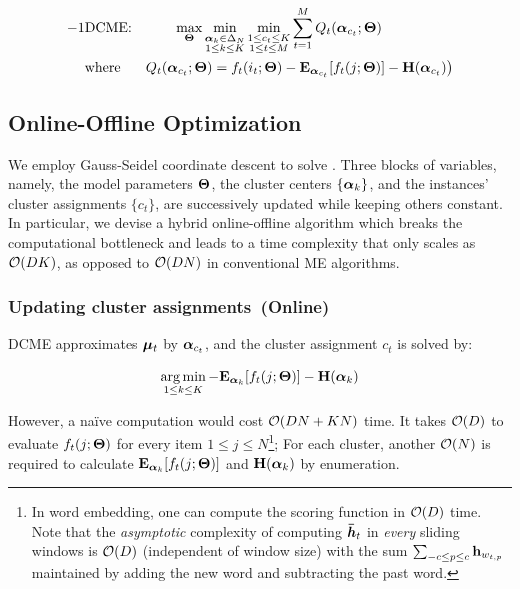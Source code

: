\begin{alignat}{-1}
  &\textrm{DCME:} && \qquad
\max\limits_\THETA
\min\limits_{\substack{\valpha_k \in \Delta_N \\ 1 \le k \le K}}
\min\limits_{\substack{1 \le c_t \le K \\ 1 \le t \le M}}
\sum\limits_{t=1}^M Q_t(\valpha_{c_t}; \THETA) \label{eq::dcme} \\
  &\textrm{where~~} &&
Q_t(\valpha_{c_t}; \THETA) =
  f_t(i_t;\THETA) -
  \E_{\valpha_{c_t}}[f_t(j;\THETA)] -
  \entropy(\valpha_{c_t})\big) \nonumber
\end{alignat}

\subsection{Online-Offline Optimization}

We employ Gauss-Seidel coordinate descent to solve .  Three
blocks of variables, namely, the model parameters $\mathbf{\Theta}$, the cluster centers
$\{\boldsymbol{\alpha}_k\}$, and the instances' cluster assignments $\{c_t\}$, are
successively updated while keeping others constant. In particular, we devise a
hybrid online-offline algorithm which breaks the computational bottleneck and
leads to a time complexity that only scales as $\mathcal{O}(DK)$, as opposed to
$\mathcal{O}(DN)$ in conventional ME algorithms.

\subsubsection{Updating cluster assignments~(Online)}

DCME approximates $\boldsymbol{\mu}_t$ by $\boldsymbol{\alpha}_{c_t}$, and the cluster assignment $c_t$
is solved by:

\begin{equation}
  \operatorname*{arg\,min}\limits_{1 \le k \le K} - \mathbf{E}_{\boldsymbol{\alpha}_{k}}[f_t(j;\mathbf{\Theta})]
        - \mathbf{H}(\boldsymbol{\alpha}_{k}) \label{eq::clu_mem}
\end{equation}

However, a na\"{i}ve computation would cost $\mathcal{O}(DN + KN)$ time. It takes
$\mathcal{O}(D)$ to evaluate $f_t(j;\mathbf{\Theta})$ for every item $1 \le j \le N$\footnote{In
  word embedding, one can compute the scoring function in $\mathcal{O}(D)$ time. Note
  that the \emph{asymptotic} complexity of computing $\boldsymbol{\bar{h}}_t$ in \emph{every}
sliding windows is $\mathcal{O}(D)$ (independent of window size) with the sum $\sum_{-c
\le p \le c} \mathbf{h}_{w_{t,p}}$ maintained by adding the new word and subtracting
the past word.}; For each cluster, another $\mathcal{O}(N)$ is required to calculate
$\mathbf{E}_{\boldsymbol{\alpha}_{k}}[f_t(j;\mathbf{\Theta})]$ and $\mathbf{H}(\boldsymbol{\alpha}_k)$ by enumeration.

